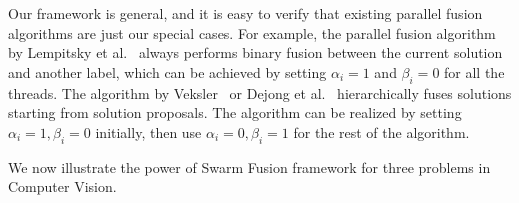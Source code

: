 
 Our framework is
general, and it is easy to verify that existing parallel fusion
algorithms are just our special cases.
%
For example, the parallel fusion algorithm by Lempitsky et
al.~\cite{viktor} always performs binary fusion between the current
solution and another label, which can be achieved by setting $\alpha_i =
1$ and $\beta_i = 0$ for all the threads. The algorithm by
Veksler~\cite{olga} or Dejong et al.~\cite{dejong} hierarchically fuses
solutions starting from solution proposals. The algorithm can be
realized by setting $\alpha_i = 1, \beta_i = 0$ initially, then use
$\alpha_i = 0, \beta_i=1$  for the rest of the algorithm.

\noindent
We now illustrate the power of Swarm Fusion framework for three problems
in Computer Vision. 






